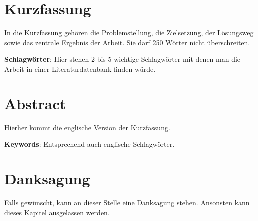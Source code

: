 \documentclass[utf8, a4paper, 11pt, parskip, pointlessnumbers]{scrreprt}
\begin{document}

\pagestyle{fancy} %
\setlength\parskip{4pt} %

\chapter*{Kurzfassung}
In die Kurzfassung gehören die Problemstellung, die Zielsetzung, der Lösungsweg sowie das zentrale Ergebnis der Arbeit. Sie darf 250 Wörter nicht überschreiten.

\textbf{Schlagwörter}: Hier stehen 2 bis 5 wichtige Schlagwörter mit denen man die Arbeit in einer Literaturdatenbank finden würde.

\chapter*{Abstract}
Hierher kommt die englische Version der Kurzfassung.

\textbf{Keywords}: Entsprechend auch englische Schlagwörter.

\chapter*{Danksagung}
Falls gewünscht, kann an dieser Stelle eine Danksagung stehen. Ansonsten kann dieses Kapitel ausgelassen werden. 

\newpage
\let\oldcftchapfont = \cftchapfont
\renewcommand\cftchapfont{\normalfont\bfseries}
\renewcommand{\contentsname}{\Large\normalfont\bfseries Inhaltsverzeichnis}
\setlength\cftbeforetoctitleskip{-22.5pt}
\setlength\cftaftertoctitleskip{0pt}
\renewcommand{\cftmarktoc}{\small\normalfont}
\tableofcontents
\let\cftchapfont = \oldcftchapfonth

\newpage
\renewcommand{\listfigurename}{\Large\normalfont\bfseries Abbildungsverzeichnis}
\setlength\cftbeforeloftitleskip{-20pt} 
\setlength\cftafterloftitleskip{0pt}
\renewcommand{\cftmarklof}{\small\normalfont}
\listoffigures 
{}
\end{document}
